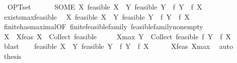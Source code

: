 \begin{isabellebody}
\ \ {\isachardoublequoteopen}OPT{\isacharunderscore}{\kern0pt}set\ {\isacharequal}{\kern0pt}\isanewline
\ \ \ \ \ {\isacharparenleft}{\kern0pt}SOME\ X{\isachardot}{\kern0pt}\ feasible\ X\ {\isasymand}\ {\isacharparenleft}{\kern0pt}{\isasymforall}Y{\isachardot}{\kern0pt}\ feasible\ Y\ {\isasymlongrightarrow}\ f\ Y\ {\isasymle}\ f\ X{\isacharparenright}{\kern0pt}{\isacharparenright}{\kern0pt}{\isachardoublequoteclose}\isanewline
\isanewline
{}\isamarkupfalse%
\ exists{\isacharunderscore}{\kern0pt}max{\isacharunderscore}{\kern0pt}feasible{\isacharcolon}{\kern0pt}\isanewline
\ \ {\isachardoublequoteopen}{\isasymexists}X{\isachardot}{\kern0pt}\ feasible\ X\ {\isasymand}\ {\isacharparenleft}{\kern0pt}{\isasymforall}Y{\isachardot}{\kern0pt}\ feasible\ Y\ {\isasymlongrightarrow}\ f\ Y\ {\isasymle}\ f\ X{\isacharparenright}{\kern0pt}{\isachardoublequoteclose}\isanewline
%
\isadelimproof
%
\endisadelimproof
%
\isatagproof
{}\isamarkupfalse%
\ {\isacharminus}{\kern0pt}\isanewline
\ \ \isamarkupfalse%
\ finite{\isacharunderscore}{\kern0pt}has{\isacharunderscore}{\kern0pt}maximal{\isacharbrackleft}{\kern0pt}OF\ finite{\isacharunderscore}{\kern0pt}feasible{\isacharunderscore}{\kern0pt}family\ feasible{\isacharunderscore}{\kern0pt}family{\isacharunderscore}{\kern0pt}nonempty{\isacharbrackright}{\kern0pt}\isanewline
\ \ \isamarkupfalse%
\ X\ \ X{\isacharunderscore}{\kern0pt}feas{\isacharcolon}{\kern0pt}\ {\isachardoublequoteopen}X\ {\isasymin}\ Collect\ feasible{\isachardoublequoteclose}\isanewline
\ \ \ \ \ X{\isacharunderscore}{\kern0pt}max{\isacharcolon}{\kern0pt}\ {\isachardoublequoteopen}{\isasymforall}Y\ {\isasymin}\ Collect\ feasible{\isachardot}{\kern0pt}\ f\ Y\ {\isasymle}\ f\ X{\isachardoublequoteclose}\isanewline
\ \ \ \ \isamarkupfalse%
\ blast\isanewline
\ \ \isamarkupfalse%
\ {\isachardoublequoteopen}feasible\ X\ {\isasymand}\ {\isacharparenleft}{\kern0pt}{\isasymforall}Y{\isachardot}{\kern0pt}\ feasible\ Y\ {\isasymlongrightarrow}\ f\ Y\ {\isasymle}\ f\ X{\isacharparenright}{\kern0pt}{\isachardoublequoteclose}\isanewline
\ \ \ \ \isamarkupfalse%
\ X{\isacharunderscore}{\kern0pt}feas\ X{\isacharunderscore}{\kern0pt}max\ \isamarkupfalse%
\ auto\isanewline
\ \ \isamarkupfalse%
\ {\isacharquery}{\kern0pt}thesis\ \isakeywordONE{{\isachardot}{\kern0pt}{\isachardot}{\kern0pt}}\isamarkupfalse%
\isanewline
{}\isamarkupfalse%
%
\endisatagproof

\end{isabellebody}
